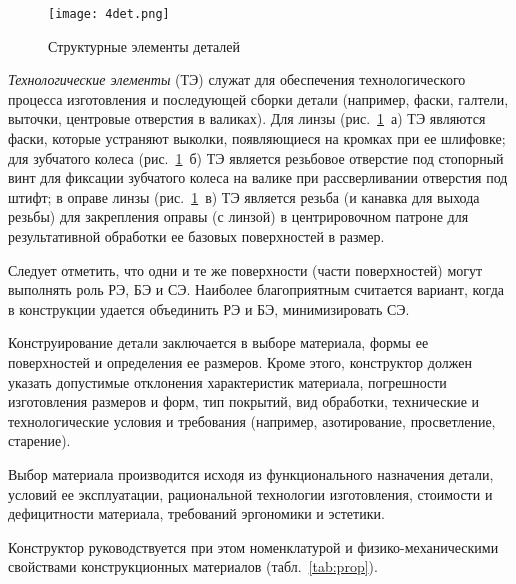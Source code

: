 \begin{figure}[H]
	\caption{Структурные элементы деталей}
	\texttt{[image: 4det.png]}
	\label{pic:4det}
\end{figure}

\textit{Технологические элементы} (ТЭ) служат для обеспечения технологического процесса изготовления и последующей сборки детали (например, фаски, галтели, выточки, центровые отверстия в валиках). Для линзы (рис.~\ref{pic:4det}~а) ТЭ являются фаски, которые устраняют выколки, появляющиеся на кромках при ее шлифовке; для зубчатого колеса (рис.~\ref{pic:4det}~б) ТЭ является резьбовое отверстие под стопорный винт для фиксации зубчатого колеса на валике при рассверливании отверстия под штифт; в оправе линзы (рис.~\ref{pic:4det}~в) ТЭ является резьба (и канавка для выхода резьбы) для закрепления оправы (с линзой) в центрировочном патроне для результативной обработки ее базовых поверхностей в размер.

Следует отметить, что одни и те же поверхности (части поверхностей) могут выполнять роль РЭ, БЭ и СЭ. Наиболее благоприятным считается вариант, когда в конструкции удается объединить РЭ и БЭ, минимизировать СЭ.

Конструирование детали заключается в выборе материала, формы ее поверхностей и определения ее размеров. Кроме этого, конструктор должен указать допустимые отклонения характеристик материала, погрешности изготовления размеров и форм, тип покрытий, вид обработки, технические и технологические условия и требования (например, азотирование, просветление, старение).

Выбор материала производится исходя из функционального назначения детали, условий ее эксплуатации, рациональной технологии изготовления, стоимости и дефицитности материала, требований эргономики и эстетики.

Конструктор руководствуется при этом номенклатурой и физико-механическими свойствами конструкционных материалов (табл.~\ref{tab:prop}).


